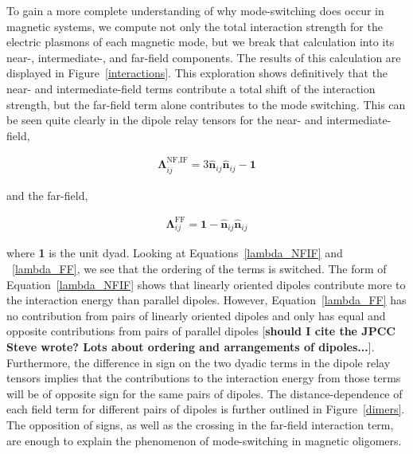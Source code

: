 \documentclass[journal=apchd5,manuscript=article]{achemso}
\begin{document}
To gain a more complete understanding of why mode-switching does occur in magnetic systems, we compute not only the total interaction strength for the electric plasmons of each magnetic mode, but we break that calculation into its near-, intermediate-, and far-field components. The results of this calculation are displayed in Figure~\ref{interactions}. This exploration shows definitively that the near- and intermediate-field terms contribute a total shift of the interaction strength, but the far-field term alone contributes to the mode switching. This can be seen quite clearly in the dipole relay tensors for the near- and intermediate-field,

\begin{equation}
\begin{aligned}
\boldsymbol{\Lambda}_{ij}^{\textrm{NF,IF}} = 3\hat{\textbf{n}}_{ij}\hat{\textbf{n}}_{ij} -\textbf{1}
\label{lambda_NFIF}
\end{aligned}
\end{equation}

and the far-field,

\begin{equation}
\begin{aligned}
\boldsymbol{\Lambda}_{ij}^{\textrm{FF}} = \textbf{1}-\hat{\textbf{n}}_{ij}\hat{\textbf{n}}_{ij}
\label{lambda_FF}
\end{aligned}
\end{equation}

where \textbf{1} is the unit dyad. Looking at Equations~\ref{lambda_NFIF} and ~\ref{lambda_FF}, we see that the ordering of the terms is switched. The form of Equation~\ref{lambda_NFIF} shows that linearly oriented dipoles contribute more to the interaction energy than parallel dipoles. However, Equation~\ref{lambda_FF} has no contribution from pairs of linearly oriented dipoles and only has equal and opposite contributions from pairs of parallel dipoles [\textbf{should I cite the JPCC Steve wrote? Lots about ordering and arrangements of dipoles...}]. Furthermore, the difference in sign on the two dyadic terms in the dipole relay tensors implies that the contributions to the interaction energy from those terms will be of opposite sign for the same pairs of dipoles. The distance-dependence of each field term for different pairs of dipoles is further outlined in Figure~\ref{dimers}. The opposition of signs, as well as the crossing in the far-field interaction term, are enough to explain the phenomenon of mode-switching in magnetic oligomers.
\end{document}
